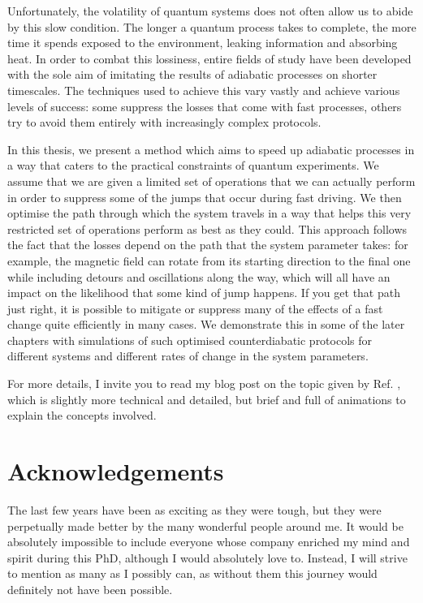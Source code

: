 \documentclass[a4paper,oneside,11pt]{book}
\begin{document}
Unfortunately, the volatility of quantum systems does not often allow us to abide by this slow condition. The longer a quantum process takes to complete, the more time it spends exposed to the environment, leaking information and absorbing heat. In order to combat this lossiness, entire fields of study have been developed with the sole aim of imitating the results of adiabatic processes on shorter timescales. The techniques used to achieve this vary vastly and achieve various levels of success: some suppress the losses that come with fast processes, others try to avoid them entirely with increasingly complex protocols.

In this thesis, we present a method which aims to speed up adiabatic processes in a way that caters to the practical constraints of quantum experiments. We assume that we are given a limited set of operations that we can actually perform in order to suppress some of the jumps that occur during fast driving. We then optimise the path through which the system travels in a way that helps this very restricted set of operations perform as best as they could. This approach follows the fact that the losses depend on the path that the system parameter takes: for example, the magnetic field can rotate from its starting direction to the final one while including detours and oscillations along the way, which will all have an impact on the likelihood that some kind of jump happens. If you get that path just right, it is possible to mitigate or suppress many of the effects of a fast change quite efficiently in many cases. We demonstrate this in some of the later chapters with simulations of such optimised counterdiabatic protocols for different systems and different rates of change in the system parameters. 

For more details, I invite you to read my blog post on the topic given by Ref. \cite{cepaite_cold_2023}, which is slightly more technical and detailed, but brief and full of animations to explain the concepts involved. 

\chapter{Acknowledgements}

The last few years have been as exciting as they were tough, but they were perpetually made better by the many wonderful people around me. It would be absolutely impossible to include everyone whose company enriched my mind and spirit during this PhD, although I would absolutely love to. Instead, I will strive to mention as many as I possibly can, as without them this journey would definitely not have been possible.
\end{document}
